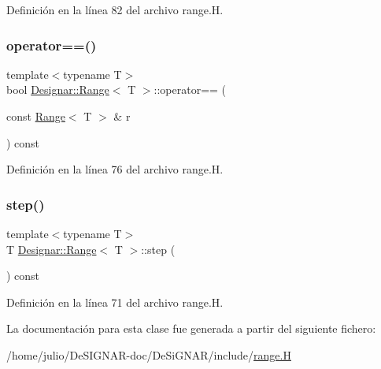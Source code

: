 Definición en la línea 82 del archivo range.\+H.

\mbox{\label{class_designar_1_1_range_ac15a931a2a2de890571f85cff64f6891}} 
\subsubsection{\texorpdfstring{operator==()}{operator==()}}
{\footnotesize\ttfamily template$<$typename T$>$ \\
bool \hyperlink{class_designar_1_1_range}{Designar\+::\+Range}$<$ T $>$\+::operator== (\begin{DoxyParamCaption}\item[{const \hyperlink{class_designar_1_1_range}{Range}$<$ T $>$ \&}]{r }\end{DoxyParamCaption}) const\hspace{0.3cm}{\ttfamily [inline]}}



Definición en la línea 76 del archivo range.\+H.

\mbox{\label{class_designar_1_1_range_a831f82b8651e4b4a437aa786288b5aef}} 
\subsubsection{\texorpdfstring{step()}{step()}}
{\footnotesize\ttfamily template$<$typename T$>$ \\
T \hyperlink{class_designar_1_1_range}{Designar\+::\+Range}$<$ T $>$\+::step (\begin{DoxyParamCaption}{ }\end{DoxyParamCaption}) const\hspace{0.3cm}{\ttfamily [inline]}}



Definición en la línea 71 del archivo range.\+H.



La documentación para esta clase fue generada a partir del siguiente fichero\+:\begin{DoxyCompactItemize}
\item 
/home/julio/\+De\+S\+I\+G\+N\+A\+R-\/doc/\+De\+Si\+G\+N\+A\+R/include/\hyperlink{range_8_h}{range.\+H}\end{DoxyCompactItemize}
